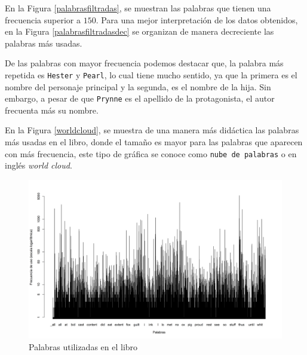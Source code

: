 \documentclass[fontsize=12pt]{article}
\begin{document}
En la Figura \ref{palabrasfiltradas}, se muestran las palabras que tienen una frecuencia superior a $150$. Para una mejor interpretación de los datos obtenidos, en la Figura \ref{palabrasfiltradasdec} se organizan de manera decreciente las palabras más usadas. 

De las palabras con mayor frecuencia podemos destacar que, la palabra más repetida es \texttt{Hester} y \texttt{Pearl}, lo cual tiene mucho sentido, ya que la primera es el nombre del personaje principal y la segunda, es el nombre de la hija. Sin embargo, a pesar de que \texttt{Prynne} es el apellido de la protagonista, el autor frecuenta más su nombre. 

En la Figura \ref{worldcloud}, se muestra de una manera más didáctica las palabras más usadas en el libro, donde el tamaño es mayor para las palabras que aparecen con más frecuencia, este tipo de gráfica se conoce como \texttt{nube de palabras} o en inglés \textit{world cloud}.

\begin{figure}
\centering
\includegraphics[scale=0.5]{Figures/palabrasEnElTexto.png}
\caption{Palabras utilizadas en el libro}
\label{palabras}
\end{figure}
\end{document}
